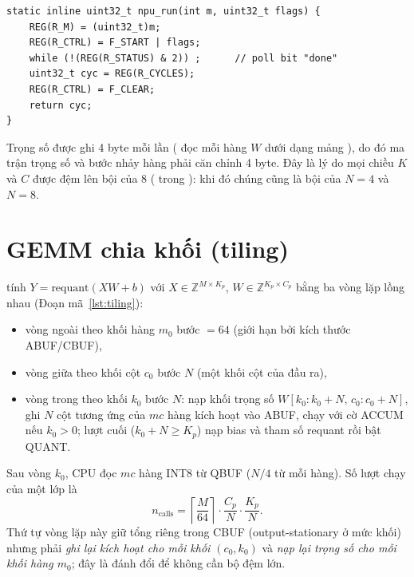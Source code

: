 \begin{lstlisting}[style=codec, caption={Chạy một lượt và chờ hoàn tất bằng polling (\code{fw/npu.h})}, label={lst:npurun}]
static inline uint32_t npu_run(int m, uint32_t flags) {
    REG(R_M) = (uint32_t)m;
    REG(R_CTRL) = F_START | flags;
    while (!(REG(R_STATUS) & 2)) ;      // poll bit "done"
    uint32_t cyc = REG(R_CYCLES);
    REG(R_CTRL) = F_CLEAR;
    return cyc;
}
\end{lstlisting}

Trọng số được ghi 4 byte mỗi lần ( đọc mỗi hàng $W$ dưới dạng mảng ), do đó ma trận trọng số và bước nhảy hàng  phải căn chỉnh 4 byte. Đây là lý do mọi chiều $K$ và $C$ được đệm lên bội của 8 ( trong ): khi đó chúng cũng là bội của $N=4$ và $N=8$.

\section{GEMM chia khối (tiling)}
\label{sec:tiling}
 tính $Y=\text{requant}(XW+b)$ với $X\in\mathbb{Z}^{M\times K_p}$, $W\in\mathbb{Z}^{K_p\times C_p}$ bằng ba vòng lặp lồng nhau (Đoạn mã~\ref{lst:tiling}):
\begin{itemize}
  \item vòng ngoài theo khối hàng $m_0$ bước $=64$ (giới hạn bởi kích thước ABUF/CBUF),
  \item vòng giữa theo khối cột $c_0$ bước $N$ (một khối cột của đầu ra),
  \item vòng trong theo khối $k_0$ bước $N$: nạp khối trọng số $W[k_0{:}k_0{+}N,\,c_0{:}c_0{+}N]$, ghi $N$ cột tương ứng của $mc$ hàng kích hoạt vào ABUF, chạy với cờ ACCUM nếu $k_0>0$; lượt cuối ($k_0+N\ge K_p$) nạp bias và tham số requant rồi bật QUANT.
\end{itemize}
Sau vòng $k_0$, CPU đọc $mc$ hàng INT8 từ QBUF ($N/4$ từ mỗi hàng). Số lượt chạy \NPU{} của một lớp là
\begin{equation}
  n_\text{calls} = \left\lceil \frac{M}{64}\right\rceil \cdot \frac{C_p}{N} \cdot \frac{K_p}{N}.
  \label{eq:calls}
\end{equation}
Thứ tự vòng lặp này giữ tổng riêng trong CBUF (output-stationary ở mức khối) nhưng phải \emph{ghi lại kích hoạt cho mỗi khối $(c_0,k_0)$} và \emph{nạp lại trọng số cho mỗi khối hàng $m_0$}; đây là đánh đổi để không cần bộ đệm lớn.


